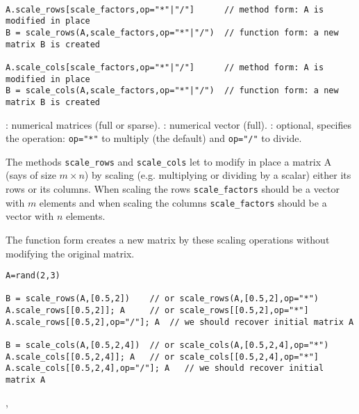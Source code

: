\begin{mandesc}
  \\ 
\end{mandesc}
\begin{calling_sequence}
\begin{verbatim}
A.scale_rows[scale_factors,op="*"|"/"]      // method form: A is modified in place
B = scale_rows(A,scale_factors,op="*"|"/")  // function form: a new matrix B is created

A.scale_cols[scale_factors,op="*"|"/"]      // method form: A is modified in place
B = scale_cols(A,scale_factors,op="*"|"/")  // function form: a new matrix B is created
\end{verbatim}
\end{calling_sequence}
\begin{parameters}
  \begin{varlist}
    : numerical matrices (full or sparse).
    : numerical vector (full).
    : optional, specifies the operation: \verb+op="*"+ to multiply (the default)
                   and  \verb+op="/"+ to divide.
  \end{varlist}
\end{parameters}

\begin{mandescription}

The methods \verb+scale_rows+ and \verb+scale_cols+ let to modify in place a matrix A 
(says of size $m \times n$) by scaling (e.g. multiplying or dividing by a scalar) either its rows 
or its columns. When scaling the rows  \verb+scale_factors+ should be a vector with $m$ 
elements and when scaling the columns \verb+scale_factors+ should be a vector with 
$n$ elements.

The function form  creates a new matrix by these scaling operations without modifying 
the original matrix.
\end{mandescription}


\begin{examples}
\begin{Verbatim}
A=rand(2,3)

B = scale_rows(A,[0.5,2])    // or scale_rows(A,[0.5,2],op="*") 
A.scale_rows[[0.5,2]]; A     // or scale_rows[[0.5,2],op="*"] 
A.scale_rows[[0.5,2],op="/"]; A  // we should recover initial matrix A

B = scale_cols(A,[0.5,2,4])  // or scale_cols(A,[0.5,2,4],op="*") 
A.scale_cols[[0.5,2,4]]; A   // or scale_cols[[0.5,2,4],op="*"] 
A.scale_cols[[0.5,2,4],op="/"]; A   // we should recover initial matrix A
\end{Verbatim}

\end{examples}

\begin{manseealso}
,
\end{manseealso}

